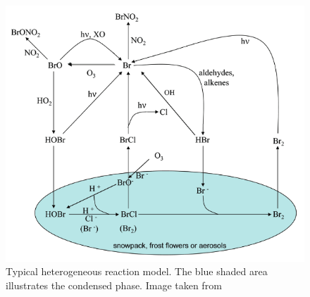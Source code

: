 \begin{figure}
    \centering
    \includegraphics[width=0.7\linewidth]{Chapter2_Theory/images/ODE_Finlayson-Pitts.png}
    \caption{Typical heterogeneous reaction model. The blue shaded area illustrates the condensed phase. Image taken from \cite{FinlaysonPitts2010}}
    \label{fig:het_react}
\end{figure}
